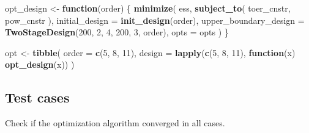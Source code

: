 \documentclass[
]{book}
\newenvironment{Shaded}{\begin{snugshade}}{\end{snugshade}}
\newcommand{\ControlFlowTok}[1]{\textcolor[rgb]{0.13,0.29,0.53}{\textbf{#1}}}
\newcommand{\DataTypeTok}[1]{\textcolor[rgb]{0.13,0.29,0.53}{#1}}
\newcommand{\DecValTok}[1]{\textcolor[rgb]{0.00,0.00,0.81}{#1}}
\newcommand{\KeywordTok}[1]{\textcolor[rgb]{0.13,0.29,0.53}{\textbf{#1}}}
\newcommand{\NormalTok}[1]{#1}
\newcommand{\OperatorTok}[1]{\textcolor[rgb]{0.81,0.36,0.00}{\textbf{#1}}}
\newcommand{\StringTok}[1]{\textcolor[rgb]{0.31,0.60,0.02}{#1}}
\begin{document}
\begin{Shaded}
\begin{Highlighting}[]
\NormalTok{opt_design <-}\StringTok{ }\ControlFlowTok{function}\NormalTok{(order) \{}
    \KeywordTok{minimize}\NormalTok{(}
\NormalTok{        ess,}
        \KeywordTok{subject_to}\NormalTok{(}
\NormalTok{            toer_cnstr,}
\NormalTok{            pow_cnstr}
\NormalTok{        ),}
        \DataTypeTok{initial_design =} \KeywordTok{init_design}\NormalTok{(order),}
        \DataTypeTok{upper_boundary_design =} \KeywordTok{TwoStageDesign}\NormalTok{(}\DecValTok{200}\NormalTok{, }\DecValTok{2}\NormalTok{, }\DecValTok{4}\NormalTok{, }\DecValTok{200}\NormalTok{, }\DecValTok{3}\NormalTok{, order),}
        \DataTypeTok{opts =}\NormalTok{ opts}
\NormalTok{    )}
\NormalTok{\}}

\NormalTok{opt <-}\StringTok{ }\KeywordTok{tibble}\NormalTok{(}
  \DataTypeTok{order  =} \KeywordTok{c}\NormalTok{(}\DecValTok{5}\NormalTok{, }\DecValTok{8}\NormalTok{, }\DecValTok{11}\NormalTok{),}
  \DataTypeTok{design =} \KeywordTok{lapply}\NormalTok{(}\KeywordTok{c}\NormalTok{(}\DecValTok{5}\NormalTok{, }\DecValTok{8}\NormalTok{, }\DecValTok{11}\NormalTok{), }\ControlFlowTok{function}\NormalTok{(x) }\KeywordTok{opt_design}\NormalTok{(x))}
\NormalTok{)}
\end{Highlighting}
\end{Shaded}

\hypertarget{test-cases-10}{%
\subsection{Test cases}\label{test-cases-10}}

Check if the optimization algorithm converged in all cases.

\begin{Shaded}
\end{Shaded}
\end{document}
